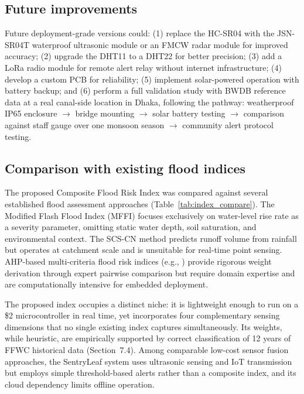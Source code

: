 \documentclass[5p,twocolumn]{elsarticle}
\begin{document}
\subsection{Future improvements}

Future deployment-grade versions could: (1) replace the HC-SR04 with the JSN-SR04T waterproof ultrasonic module or an FMCW radar module \cite{zeng2025} for improved accuracy; (2) upgrade the DHT11 to a DHT22 for better precision; (3) add a LoRa radio module for remote alert relay without internet infrastructure; (4) develop a custom PCB for reliability; (5) implement solar-powered operation with battery backup; and (6) perform a full validation study with BWDB reference data at a real canal-side location in Dhaka, following the pathway: weatherproof IP65 enclosure $\to$ bridge mounting $\to$ solar battery testing $\to$ comparison against staff gauge over one monsoon season $\to$ community alert protocol testing.

\subsection{Comparison with existing flood indices}

The proposed Composite Flood Risk Index was compared against several established flood assessment approaches (Table~\ref{tab:index_compare}). The Modified Flash Flood Index (MFFI) \cite{kim2014} focuses exclusively on water-level rise rate as a severity parameter, omitting static water depth, soil saturation, and environmental context. The SCS-CN method \cite{usda2004} predicts runoff volume from rainfall but operates at catchment scale and is unsuitable for real-time point sensing. AHP-based multi-criteria flood risk indices (e.g., \cite{tao2024}) provide rigorous weight derivation through expert pairwise comparison but require domain expertise and are computationally intensive for embedded deployment.

The proposed index occupies a distinct niche: it is lightweight enough to run on a \$2 microcontroller in real time, yet incorporates four complementary sensing dimensions that no single existing index captures simultaneously. Its weights, while heuristic, are empirically supported by correct classification of 12 years of FFWC historical data (Section~7.4). Among comparable low-cost sensor fusion approaches, the SentryLeaf system \cite{rohan2025} uses ultrasonic sensing and IoT transmission but employs simple threshold-based alerts rather than a composite index, and its cloud dependency limits offline operation.
\end{document}
